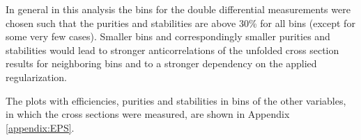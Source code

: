 In general in this analysis the bins for the double differential measurements were chosen such that the purities and stabilities are above 30\% for all
bins (except for some very few cases). Smaller bins and correspondingly smaller purities and stabilities would lead to stronger anticorrelations of the
unfolded cross section results for neighboring bins and to a stronger dependency on the applied regularization.

The plots with efficiencies, purities and stabilities in bins of the other variables, in which the cross sections were measured, are shown in Appendix \ref{appendix:EPS}.
